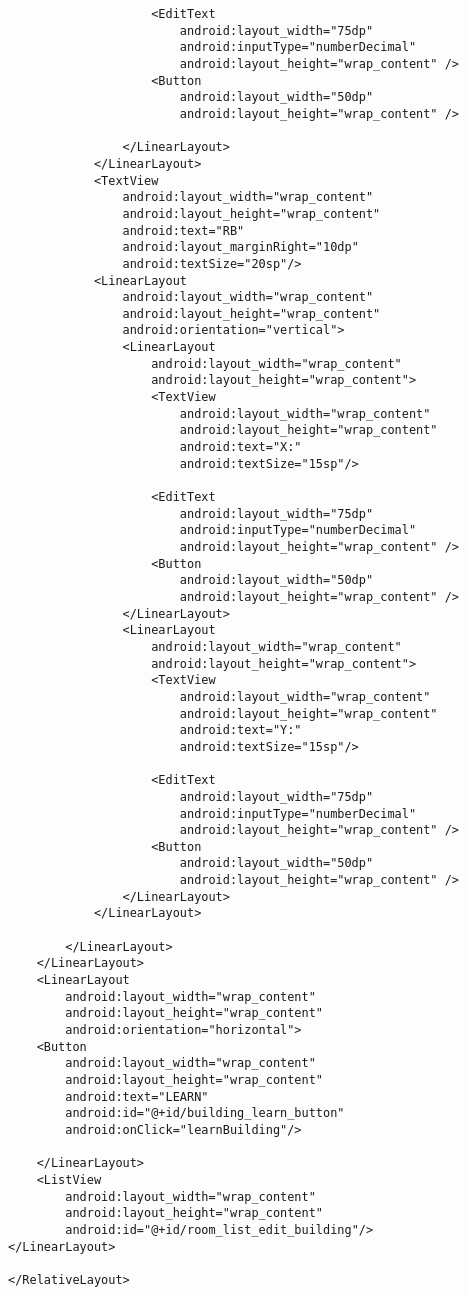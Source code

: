 \begin{lstlisting}
                    <EditText
                        android:layout_width="75dp"
                        android:inputType="numberDecimal"
                        android:layout_height="wrap_content" />
                    <Button
                        android:layout_width="50dp"
                        android:layout_height="wrap_content" />

                </LinearLayout>
            </LinearLayout>
            <TextView
                android:layout_width="wrap_content"
                android:layout_height="wrap_content"
                android:text="RB"
                android:layout_marginRight="10dp"
                android:textSize="20sp"/>
            <LinearLayout
                android:layout_width="wrap_content"
                android:layout_height="wrap_content"
                android:orientation="vertical">
                <LinearLayout
                    android:layout_width="wrap_content"
                    android:layout_height="wrap_content">
                    <TextView
                        android:layout_width="wrap_content"
                        android:layout_height="wrap_content"
                        android:text="X:"
                        android:textSize="15sp"/>

                    <EditText
                        android:layout_width="75dp"
                        android:inputType="numberDecimal"
                        android:layout_height="wrap_content" />
                    <Button
                        android:layout_width="50dp"
                        android:layout_height="wrap_content" />
                </LinearLayout>
                <LinearLayout
                    android:layout_width="wrap_content"
                    android:layout_height="wrap_content">
                    <TextView
                        android:layout_width="wrap_content"
                        android:layout_height="wrap_content"
                        android:text="Y:"
                        android:textSize="15sp"/>

                    <EditText
                        android:layout_width="75dp"
                        android:inputType="numberDecimal"
                        android:layout_height="wrap_content" />
                    <Button
                        android:layout_width="50dp"
                        android:layout_height="wrap_content" />
                </LinearLayout>
            </LinearLayout>

        </LinearLayout>
    </LinearLayout>
    <LinearLayout
        android:layout_width="wrap_content"
        android:layout_height="wrap_content"
        android:orientation="horizontal">
    <Button
        android:layout_width="wrap_content"
        android:layout_height="wrap_content"
        android:text="LEARN"
        android:id="@+id/building_learn_button"
        android:onClick="learnBuilding"/>

    </LinearLayout>
    <ListView
        android:layout_width="wrap_content"
        android:layout_height="wrap_content"
        android:id="@+id/room_list_edit_building"/>
</LinearLayout>

</RelativeLayout>
\end{lstlisting}
\newpage
